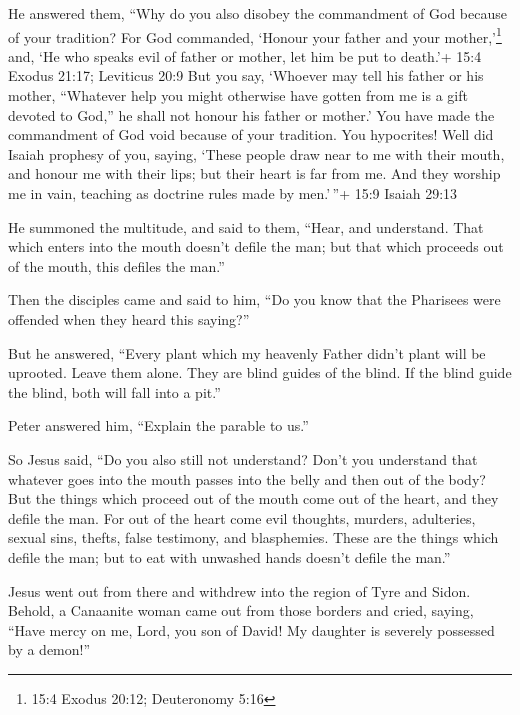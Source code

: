  He answered them, ``Why do you also disobey the commandment
of God because of your tradition?  For God commanded,
`Honour your father and your mother,'\footnote{15:4 Exodus 20:12;
  Deuteronomy 5:16} and, `He who speaks evil of father or mother, let
him be put to death.'+ 15:4 Exodus 21:17; Leviticus 20:9 
But you say, `Whoever may tell his father or his mother, ``Whatever help
you might otherwise have gotten from me is a gift devoted to God,''
 he shall not honour his father or mother.' You have made
the commandment of God void because of your tradition.  You
hypocrites! Well did Isaiah prophesy of you, saying,  `These
people draw near to me with their mouth, and honour me with their lips;
but their heart is far from me.  And they worship me in
vain, teaching as doctrine rules made by men.'\,''+ 15:9 Isaiah 29:13

 He summoned the multitude, and said to them, ``Hear, and
understand.  That which enters into the mouth doesn't
defile the man; but that which proceeds out of the mouth, this defiles
the man.''

 Then the disciples came and said to him, ``Do you know
that the Pharisees were offended when they heard this saying?''

 But he answered, ``Every plant which my heavenly Father
didn't plant will be uprooted.  Leave them alone. They are
blind guides of the blind. If the blind guide the blind, both will fall
into a pit.''

 Peter answered him, ``Explain the parable to us.''

 So Jesus said, ``Do you also still not understand?
 Don't you understand that whatever goes into the mouth
passes into the belly and then out of the body?  But the
things which proceed out of the mouth come out of the heart, and they
defile the man.  For out of the heart come evil thoughts,
murders, adulteries, sexual sins, thefts, false testimony, and
blasphemies.  These are the things which defile the man;
but to eat with unwashed hands doesn't defile the man.''

 Jesus went out from there and withdrew into the region of
Tyre and Sidon.  Behold, a Canaanite woman came out from
those borders and cried, saying, ``Have mercy on me, Lord, you son of
David! My daughter is severely possessed by a demon!''

